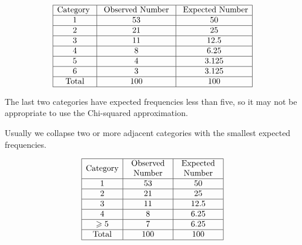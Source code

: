 \[ \begin{array}{|c|c|c|}
        \hline \text{Category } & \text{ Observed Number } & \text{ Expected Number} \\
        \hline 1                & 53                       & 50                      \\
        \hline 2                & 21                       & 25                      \\
        \hline 3                & 11                       & 12.5                    \\
        \hline 4                & 8                        & 6.25                    \\
        \hline 5                & 4                        & 3.125                   \\
        \hline 6                & 3                        & 3.125                   \\
        \hline \text{Total}     & 100                      & 100                     \\
        \hline
    \end{array} \]

The last two categories have expected frequencies less than five, so it may not be
appropriate to use the Chi-squared approximation.

Usually we collapse two or more adjacent categories with the smallest expected frequencies.

\[ \begin{array}{|c|c|c|}
        \hline \text{Category} & \begin{array}{c}
            \text{Observed} \\
            \text{Number}
        \end{array} & \begin{array}{c}
            \text{Expected} \\
            \text{Number}
        \end{array} \\
        \hline 1               & 53                         & 50                         \\
        \hline 2               & 21                         & 25                         \\
        \hline 3               & 11                         & 12.5                       \\
        \hline 4               & 8                          & 6.25                       \\
        \hline \geqslant{5}     & 7                          & 6.25                       \\
        \hline \text{Total}    & 100                        & 100                        \\
        \hline
    \end{array} \]

